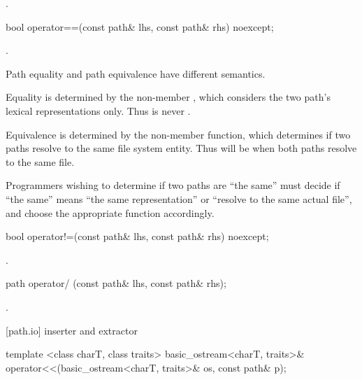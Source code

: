 \begin{itemdescr}
\pnum
\returns {}.
\end{itemdescr}

\begin{itemdecl}
bool operator==(const path& lhs, const path& rhs) noexcept;
\end{itemdecl}

\begin{itemdescr}
\pnum
\returns {}.

\pnum
\enternote Path equality and path equivalence have different semantics.

\pnum
Equality is determined by the  non-member , which considers the two path's lexical
  representations only. Thus  is never .

\pnum
Equivalence is determined by the  non-member function, which determines if two paths resolve to the same file system entity.
  Thus  will be  when both paths resolve to the same file.

\pnum
Programmers wishing to determine if two paths are ``the same'' must decide if
  ``the same'' means ``the same representation'' or ``resolve to the same actual
  file'', and choose the appropriate function accordingly. \exitnote
\end{itemdescr}

\begin{itemdecl}
bool operator!=(const path& lhs, const path& rhs) noexcept;
\end{itemdecl}

\begin{itemdescr}
\pnum
\returns {}.
\end{itemdescr}

\begin{itemdecl}
path operator/ (const path& lhs, const path& rhs);
\end{itemdecl}

\begin{itemdescr}
\pnum
\returns {}.
\end{itemdescr}

[path.io]{ inserter and extractor}

\begin{itemdecl}
template <class charT, class traits>
  basic_ostream<charT, traits>&
    operator<<(basic_ostream<charT, traits>& os, const path& p);
\end{itemdecl}


